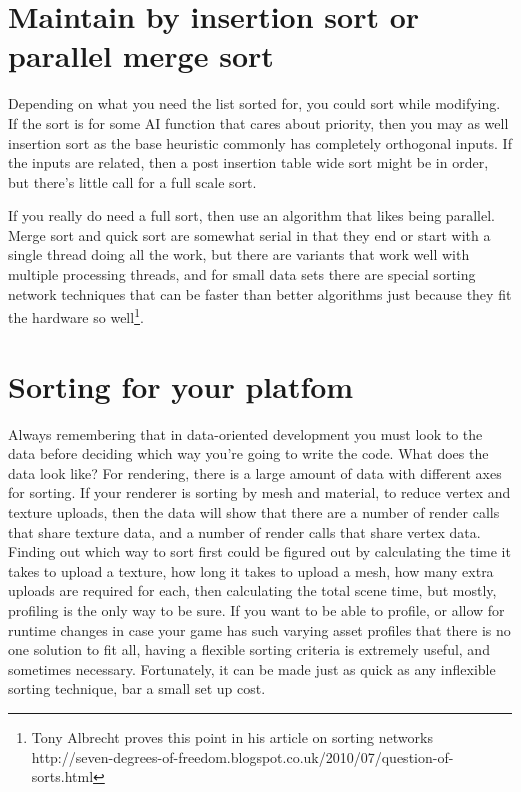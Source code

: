 \section{Maintain by insertion sort or parallel merge sort}

Depending on what you need the list sorted for, you could sort while modifying.
If the sort is for some AI function that cares about priority, then you may as
well insertion sort as the base heuristic commonly has completely orthogonal
inputs. If the inputs are related, then a post insertion table wide sort might
be in order, but there's little call for a full scale sort.

If you really do need a full sort, then use an algorithm that likes being
parallel. Merge sort and quick sort are somewhat serial in that they end or
start with a single thread doing all the work, but there are variants that work
well with multiple processing threads, and for small data sets there are
special sorting network techniques that can be faster than better algorithms
just because they fit the hardware so well\footnote{Tony Albrecht proves this
point in his article on sorting networks
http://seven-degrees-of-freedom.blogspot.co.uk/2010/07/question-of-sorts.html}.

\section{Sorting for your platfom}

Always remembering that in data-oriented development you must look to the data
before deciding which way you're going to write the code. What does the data
look like? For rendering, there is a large amount of data with different axes
for sorting. If your renderer is sorting by mesh and material, to reduce vertex
and texture uploads, then the data will show that there are a number of render
calls that share texture data, and a number of render calls that share vertex
data. Finding out which way to sort first could be figured out by calculating
the time it takes to upload a texture, how long it takes to upload a mesh, how
many extra uploads are required for each, then calculating the total scene
time, but mostly, profiling is the only way to be sure. If you want to be able
to profile, or allow for runtime changes in case your game has such varying
asset profiles that there is no one solution to fit all, having a flexible
sorting criteria is extremely useful, and sometimes necessary. Fortunately, it
can be made just as quick as any inflexible sorting technique, bar a small set
up cost.


